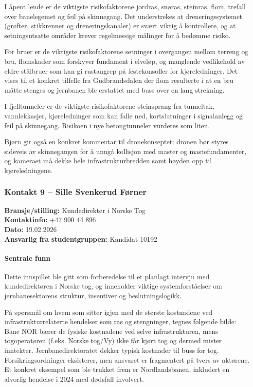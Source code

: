 I åpent lende er de viktigste risikofaktorene jordras, snøras, steinras, flom, trefall over banelegemet og feil på skinnegang. Det understrekes at dreneringssystemet (grøfter, stikkrenner og dreneringskanaler) er svært viktig å kontrollere, og at setningsutsatte områder krever regelmessige målinger for å bedømme risiko.

For bruer er de viktigste risikofaktorene setninger i overgangen mellom terreng og bru, flomskader som forskyver fundament i elveløp, og manglende vedlikehold av eldre stålbruer som kan gi rustangrep på festekonsoller for kjøreledninger. Det vises til et konkret tilfelle fra Gudbrandsdalen der flom resulterte i at en bru måtte stenges og jernbanen ble erstattet med buss over en lang strekning.

I fjelltunneler er de viktigste risikofaktorene steinsprang fra tunneltak, vannlekkasjer, kjøreledninger som kan falle ned, kortslutninger i signalanlegg og feil på skinnegang. Risikoen i nye betongtunneler vurderes som liten.

Bjørn gir også en konkret kommentar til dronekonseptet: dronen bør styres sideveis av skinnegangen for å unngå kollisjon med master og mastefundamenter, og kameraet må dekke hele infrastrukturbredden samt høyden opp til kjøreledningene.


\subsubsection{Kontakt 9  – Sille Svenkerud Førner}
\label{kontakt:norske-tog-radgivning}

\textbf{Bransje/stilling:} Kundedirektør i Norske Tog \\
\textbf{Kontaktinfo:} +47 900 44 896 \\
\textbf{Dato:} 19.02.2026 \\
\textbf{Ansvarlig fra studentgruppen:} Kandidat 10192 

\paragraph{Sentrale funn}

Dette innspillet ble gitt som forberedelse til et planlagt intervju med kundedirektøren i Norske tog, og inneholder viktige systemforståelser om jernbanesektorens struktur, insentiver og beslutningslogikk.

På spørsmål om hvem som sitter igjen med de største kostnadene ved infrastrukturrelaterte hendelser som ras og stengninger, tegnes følgende bilde: Bane NOR bærer de fysiske kostnadene ved selve infrastrukturen, mens togoperatøren (f.eks. Norske tog/Vy) ikke får kjørt tog og dermed mister inntekter. Jernbanedirektoratet dekker typisk kostnader til buss for tog. Forsikringsordninger eksisterer, men ansvaret er fragmentert på tvers av aktørene. Et konkret eksempel som ble trukket frem er Nordlandsbanen, inkludert en alvorlig hendelse i 2024 med dødsfall 
involvert.

